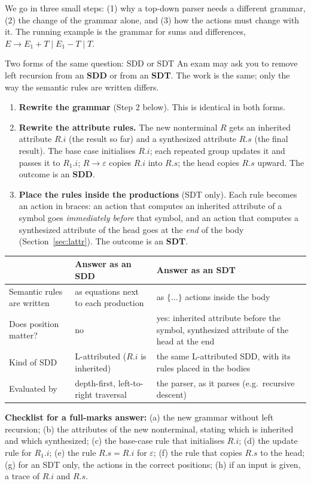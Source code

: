 \documentclass[11pt,a4paper]{article}
\begin{document}
We go in three small steps: (1) why a top-down parser needs a different grammar, (2) the change of the grammar alone, and (3) how the actions must change with it. The running example is the grammar for sums and differences, $E\to E_1+T\mid E_1-T\mid T$.

\begin{defbox}{Two forms of the same question: SDD or SDT}
An exam may ask you to remove left recursion from an \textbf{SDD} or from an \textbf{SDT}. The work is the same; only the way the semantic rules are written differs.
\begin{enumerate}[nosep]
\item \textbf{Rewrite the grammar} (Step 2 below). This is identical in both forms.
\item \textbf{Rewrite the attribute rules.} The new nonterminal $R$ gets an inherited attribute $R.i$ (the result so far) and a synthesized attribute $R.s$ (the final result). The base case initialises $R.i$; each repeated group updates it and passes it to $R_1.i$; $R\to\varepsilon$ copies $R.i$ into $R.s$; the head copies $R.s$ upward. The outcome is an \textbf{SDD}.
\item \textbf{Place the rules inside the productions} (SDT only). Each rule becomes an action in braces: an action that computes an inherited attribute of a symbol goes \emph{immediately before} that symbol, and an action that computes a synthesized attribute of the head goes at the \emph{end} of the body (Section~\ref{sec:lattr}). The outcome is an \textbf{SDT}.
\end{enumerate}
\begin{center}
\small
\begin{tabular}{@{}l p{4.6cm} p{5.6cm}@{}}
\toprule
 & \textbf{Answer as an SDD} & \textbf{Answer as an SDT} \\ \midrule
Semantic rules are written & as equations next to each production & as $\{\dots\}$ actions inside the body \\
Does position matter? & no & yes: inherited attribute before the symbol, synthesized attribute of the head at the end \\
Kind of SDD & L-attributed ($R.i$ is inherited) & the same L-attributed SDD, with its rules placed in the bodies \\
Evaluated by & depth-first, left-to-right traversal & the parser, as it parses (e.g.\ recursive descent) \\ \bottomrule
\end{tabular}
\end{center}
\textbf{Checklist for a full-marks answer:} (a) the new grammar without left recursion; (b) the attributes of the new nonterminal, stating which is inherited and which synthesized; (c) the base-case rule that initialises $R.i$; (d) the update rule for $R_1.i$; (e) the rule $R.s=R.i$ for $\varepsilon$; (f) the rule that copies $R.s$ to the head; (g) for an SDT only, the actions in the correct positions; (h) if an input is given, a trace of $R.i$ and $R.s$.
\end{defbox}
\end{document}
